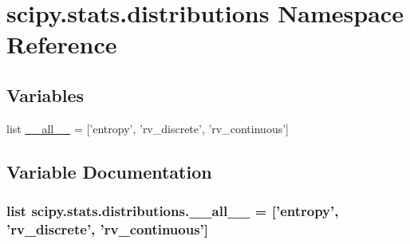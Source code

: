 \hypertarget{namespacescipy_1_1stats_1_1distributions}{}\section{scipy.\+stats.\+distributions Namespace Reference}
\label{namespacescipy_1_1stats_1_1distributions}
\subsection*{Variables}
\begin{DoxyCompactItemize}
\item 
list \hyperlink{namespacescipy_1_1stats_1_1distributions_a25e74a6f475c7d1c038c9ff66fef6804}{\+\_\+\+\_\+all\+\_\+\+\_\+} = \mbox{[}'entropy', 'rv\+\_\+discrete', 'rv\+\_\+continuous'\mbox{]}
\end{DoxyCompactItemize}


\subsection{Variable Documentation}
\hypertarget{namespacescipy_1_1stats_1_1distributions_a25e74a6f475c7d1c038c9ff66fef6804}{}
\subsubsection[{\+\_\+\+\_\+all\+\_\+\+\_\+}]{\setlength{\rightskip}{0pt plus 5cm}list scipy.\+stats.\+distributions.\+\_\+\+\_\+all\+\_\+\+\_\+ = \mbox{[}'entropy', 'rv\+\_\+discrete', 'rv\+\_\+continuous'\mbox{]}}\label{namespacescipy_1_1stats_1_1distributions_a25e74a6f475c7d1c038c9ff66fef6804}
